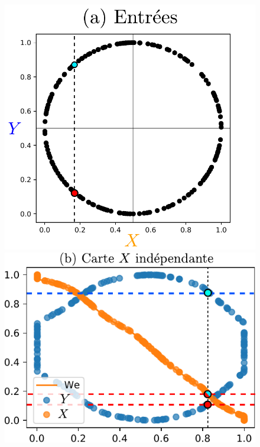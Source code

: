 \begin{figure}
\begin{minipage}{0.27\textwidth}
\includegraphics[width=\textwidth]{2som_inp_noU.pdf}
\end{minipage}
\begin{minipage}{0.34\textwidth}
\includegraphics[width=\textwidth]{weights_2som_unco.pdf}
\end{minipage}
\begin{minipage}{0.38\textwidth}

\end{minipage}
\end{figure}
